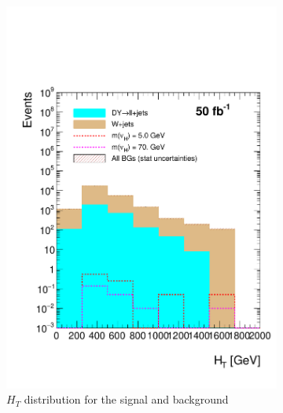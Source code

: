 \begin{figure}[h]
\centering
\begin{subfigure}{.5\textwidth}
  \centering
  \includegraphics[width=1.1\linewidth]{./Capitulos/Analysis/AfterVBFCUTS/HT_MET_20}
  \caption{$H_T$ distribution for the signal and background}
  \label{HT_VBF}
\end{subfigure}%
\begin{subfigure}{.5\textwidth}
  \centering

\end{subfigure}
\end{figure}

